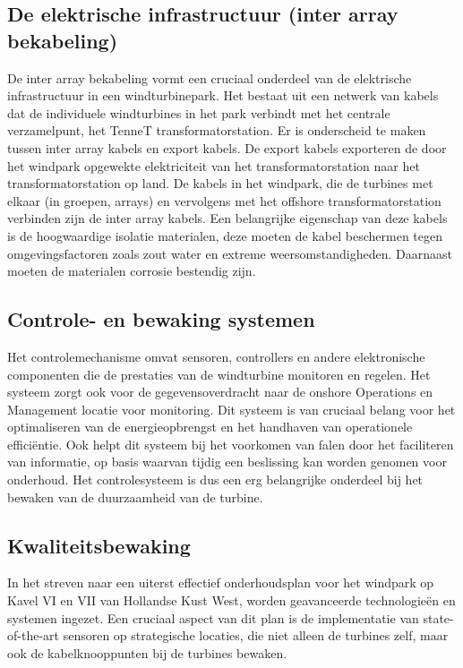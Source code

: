 \subsection{De elektrische infrastructuur (inter array bekabeling)}
De inter array bekabeling vormt een cruciaal onderdeel van de elektrische infrastructuur in een windturbinepark. Het bestaat uit een netwerk van kabels dat de individuele windturbines in het park verbindt met het centrale verzamelpunt, het TenneT transformatorstation. Er is onderscheid te maken tussen inter array kabels en export kabels. De export kabels exporteren de door het windpark opgewekte elektriciteit van het transformatorstation naar het transformatorstation op land. De kabels in het windpark, die de turbines met elkaar (in groepen, arrays) en vervolgens met het offshore transformatorstation verbinden zijn de inter array kabels. Een belangrijke eigenschap van deze kabels is de hoogwaardige isolatie materialen, deze moeten de kabel beschermen tegen omgevingsfactoren zoals zout water en extreme weersomstandigheden. Daarnaast moeten de materialen corrosie bestendig zijn.

\subsection{Controle- en bewaking systemen}
Het controlemechanisme omvat sensoren, controllers en andere elektronische componenten die de prestaties van de windturbine monitoren en regelen. Het systeem zorgt ook voor de gegevensoverdracht naar de onshore Operations en Management locatie voor monitoring. Dit systeem is van cruciaal belang voor het optimaliseren van de energieopbrengst en het handhaven van operationele efficiëntie. Ook helpt dit systeem bij het voorkomen van falen door het faciliteren van informatie, op basis waarvan tijdig een beslissing kan worden genomen voor onderhoud. Het controlesysteem is dus een erg belangrijke onderdeel bij het bewaken van de duurzaamheid van de turbine.

\subsection{Kwaliteitsbewaking}

In het streven naar een uiterst effectief onderhoudsplan voor het windpark op Kavel VI en VII van Hollandse Kust West, worden geavanceerde technologieën en systemen ingezet. Een cruciaal aspect van dit plan is de implementatie van state-of-the-art sensoren op strategische locaties, die niet alleen de turbines zelf, maar ook de kabelknooppunten bij de turbines bewaken.

